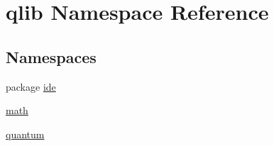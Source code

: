 \hypertarget{namespaceqlib}{}\section{qlib Namespace Reference}
\label{namespaceqlib}
\subsection*{Namespaces}
\begin{DoxyCompactItemize}
\item 
package \hyperlink{namespaceqlib_1_1ide}{ide}
\item 
 \hyperlink{namespaceqlib_1_1math}{math}
\item 
 \hyperlink{namespaceqlib_1_1quantum}{quantum}
\end{DoxyCompactItemize}
